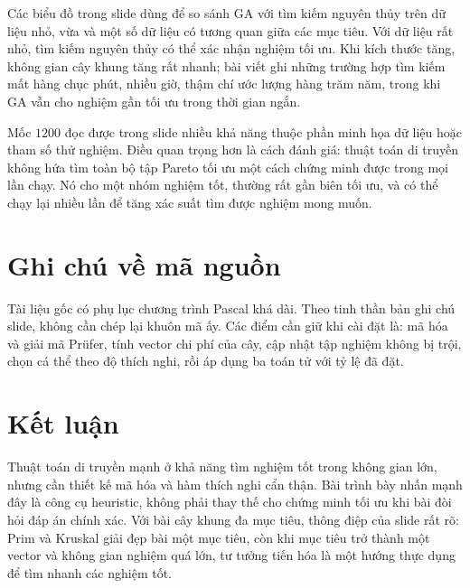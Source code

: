 \documentclass[11pt]{article}
\newcommand{\GA}{\ensuremath{\mathrm{GA}}}
\newcommand{\Pruefer}{Prüfer}
\begin{document}
Các biểu đồ trong slide dùng để so sánh \GA{} với tìm kiếm nguyên thủy trên
dữ liệu nhỏ, vừa và một số dữ liệu có tương quan giữa các mục tiêu. Với dữ
liệu rất nhỏ, tìm kiếm nguyên thủy có thể xác nhận nghiệm tối ưu. Khi kích
thước tăng, không gian cây khung tăng rất nhanh; bài viết ghi những trường
hợp tìm kiếm mất hàng chục phút, nhiều giờ, thậm chí ước lượng hàng trăm năm,
trong khi \GA{} vẫn cho nghiệm gần tối ưu trong thời gian ngắn.

Mốc \(1200\) đọc được trong slide nhiều khả năng thuộc phần minh họa dữ liệu
hoặc tham số thử nghiệm. Điều quan trọng hơn là cách đánh giá: thuật toán di
truyền không hứa tìm toàn bộ tập Pareto tối ưu một cách chứng minh được trong
mọi lần chạy. Nó cho một nhóm nghiệm tốt, thường rất gần biên tối ưu, và có
thể chạy lại nhiều lần để tăng xác suất tìm được nghiệm mong muốn.

\section{Ghi chú về mã nguồn}

Tài liệu gốc có phụ lục chương trình Pascal khá dài. Theo tinh thần bản ghi
chú slide, không cần chép lại khuôn mã ấy. Các điểm cần giữ khi cài đặt là:
mã hóa và giải mã \Pruefer{}, tính vector chi phí của cây, cập nhật tập nghiệm
không bị trội, chọn cá thể theo độ thích nghi, rồi áp dụng ba toán tử với tỷ
lệ đã đặt.

\section{Kết luận}

Thuật toán di truyền mạnh ở khả năng tìm nghiệm tốt trong không gian lớn,
nhưng cần thiết kế mã hóa và hàm thích nghi cẩn thận. Bài trình bày nhấn mạnh
đây là công cụ heuristic, không phải thay thế cho chứng minh tối ưu khi bài
đòi hỏi đáp án chính xác. Với bài cây khung đa mục tiêu, thông điệp của slide
rất rõ: Prim và Kruskal giải đẹp bài một mục tiêu, còn khi mục tiêu trở thành
một vector và không gian nghiệm quá lớn, tư tưởng tiến hóa là một hướng thực
dụng để tìm nhanh các nghiệm tốt.
\end{document}
